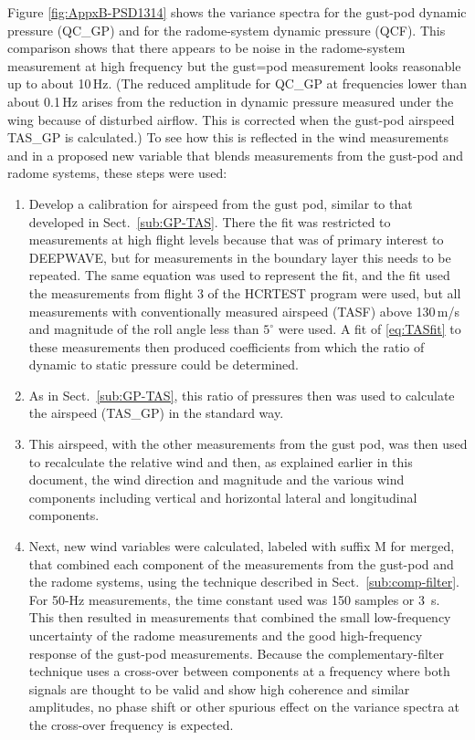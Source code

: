 \documentclass[12pt,twoside,english]{article}\usepackage[]{graphicx}\usepackage[]{color}
\let\OrgIndex\index
\renewcommand*{\index}[1]{\OrgIndex{#1}}
\begin{document}
Figure \ref{fig:AppxB-PSD1314} shows the variance spectra for the gust-pod dynamic pressure (QC\_GP) and for the radome-system dynamic pressure (QCF). This comparison shows that there appears to be noise in the radome-system measurement at high frequency but the gust=pod measurement looks reasonable up to about 10\,Hz. (The reduced amplitude for QC\_GP at frequencies lower than about 0.1\,Hz arises from the reduction in dynamic pressure measured under the wing because of disturbed airflow. This is corrected when the gust-pod airspeed TAS\_GP is calculated.) To see how this is reflected in the wind measurements and in a proposed new variable that blends measurements from the gust-pod and radome systems, these steps were used: 

\begin{enumerate}
\item Develop a calibration for airspeed from the gust pod, similar to that developed in Sect.~\ref{sub:GP-TAS}. There the fit was restricted to measurements at high flight levels because that was of primary interest to DEEPWAVE, but for measurements in the boundary layer this needs to be repeated. The same equation was used to represent the fit, and the fit used the measurements from flight 3 of the HCRTEST program were used, but all measurements with conventionally measured airspeed (TASF) above 130\,m/s and magnitude of the roll angle less than $5^{\circ}$ were used. A fit of \eqref{eq:TASfit} to these measurements then produced coefficients from which the ratio of dynamic to static pressure could be determined. 
\item As in Sect.~\ref{sub:GP-TAS}, this ratio of pressures then was used to calculate the airspeed (TAS\_GP) in the standard way. 
\item This airspeed, with the other measurements from the gust pod, was then used to recalculate the relative wind and then, as explained earlier in this document, the wind direction and magnitude and the various wind components including vertical and horizontal lateral and longitudinal components. 
\item Next, new wind variables were calculated, labeled with suffix \textquotedbl{}M\textquotedbl{} for \textquotedbl{}merged\textquotedbl{}, that combined each component of the measurements from the gust-pod and the radome systems, using the technique described in Sect.~\ref{sub:comp-filter}. For 50-Hz measurements, the time constant used was 150 samples or 3~s. This then resulted in measurements that combined the small low-frequency uncertainty of the radome measurements and the good high-frequency response of the gust-pod measurements. Because the complementary-filter technique uses a cross-over between components at a frequency where both signals are thought to be valid and show high coherence and similar amplitudes, no phase shift or other spurious effect on the variance spectra at the cross-over frequency is expected. 
\end{enumerate}
\end{document}
